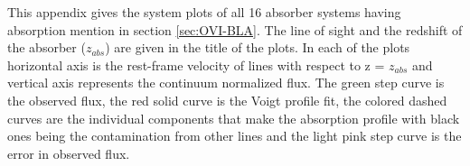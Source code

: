  \label{ap:system-plots}

This appendix gives the system plots of all 16 absorber systems having  absorption mention in section \ref{sec:OVI-BLA}. The line of sight and the redshift of the absorber ($z_{abs}$) are given in the title of the plots. In each of the plots horizontal axis is the rest-frame velocity of lines with respect to z = $z_{abs}$ and vertical axis represents the continuum normalized flux. The green step curve is the observed flux, the red solid curve is the Voigt profile fit, the colored dashed curves are the individual components that make the absorption profile with black ones being the contamination from other lines and the light pink step curve is the error in observed flux.

\newpage

